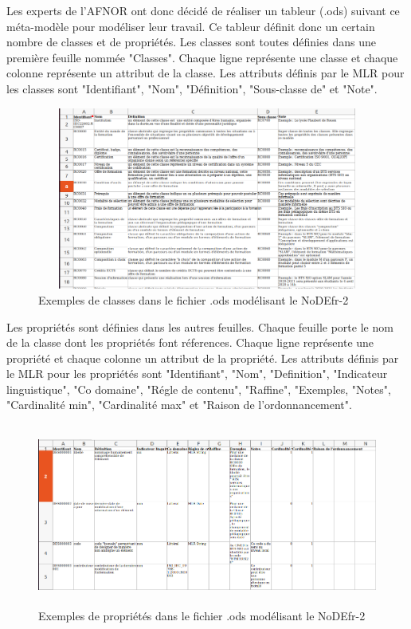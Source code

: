 \documentclass{article}
\begin{document}
Les experts de l'AFNOR ont donc décidé de réaliser un tableur (.ods) suivant ce méta-modèle pour modéliser leur travail. Ce tableur définit donc un certain nombre de classes et de propriétés. Les classes sont toutes définies dans une première feuille nommée "Classes". Chaque ligne représente une classe et chaque colonne représente un attribut de la classe. Les attributs définis par le MLR pour les classes sont "Identifiant", "Nom", "Définition", "Sous-classe de" et "Note".\\

\newpage

\begin{figure}[!ht]
    \center
    \includegraphics[width=13cm, height=6cm]{img/classes}
    \caption{Exemples de classes dans le fichier .ods modélisant le NoDEfr-2}
\end{figure}

Les propriétés sont définies dans les autres feuilles. Chaque feuille porte le nom de la classe dont les propriétés font réferences. Chaque ligne représente une propriété et chaque colonne un attribut de la propriété. Les attributs définis par le MLR pour les propriétés sont "Identifiant", "Nom", "Definition", "Indicateur linguistique", "Co domaine", "Régle de contenu", "Raffine", "Exemples, "Notes", "Cardinalité min", "Cardinalité max" et "Raison de l'ordonnancement".

\begin{figure}[!ht]
    \center
    \includegraphics[width=13cm, height=6cm]{img/proprietes}
    \caption{Exemples de propriétés dans le fichier .ods modélisant le NoDEfr-2}
\end{figure}
\end{document}
